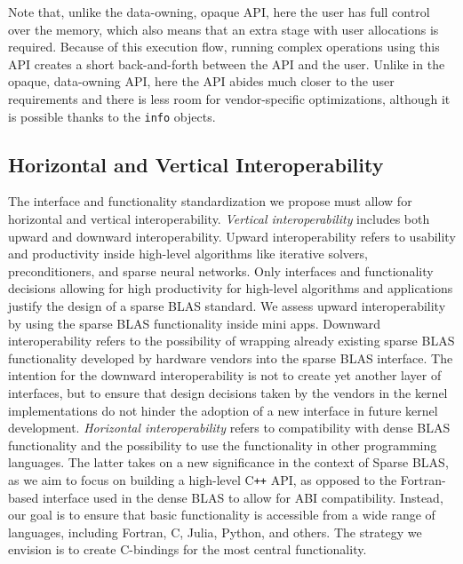 \documentclass{article}
\newcommand{\cplusplus}{C\texttt{++}\xspace}
\begin{document}
Note that, unlike the data-owning, opaque API, here the user has full control over the memory, which also means that an extra stage with user allocations is required. Because of this execution flow, running complex operations using this API creates a short back-and-forth between the API and the user. Unlike in the opaque, data-owning API, here the API abides much closer to the user requirements and there is less room for vendor-specific optimizations, although it is possible thanks to the \texttt{info} objects.

\noindent

\fi

\subsection{Horizontal and Vertical Interoperability}

The interface and functionality standardization we propose must allow for horizontal and vertical interoperability. 
\textit{Vertical interoperability} includes both upward and downward interoperability. Upward interoperability refers to usability and productivity inside high-level algorithms like iterative solvers, preconditioners, and sparse neural networks. Only interfaces and functionality decisions allowing for high productivity for high-level algorithms and applications justify the design of a sparse BLAS standard. We assess upward interoperability by using the sparse BLAS functionality inside mini apps. 
Downward interoperability refers to the possibility of wrapping already existing sparse BLAS functionality developed by hardware vendors into the sparse BLAS interface. The intention for the downward interoperability is not to create yet another layer of interfaces, but to ensure that design decisions taken by the vendors in the kernel implementations do not hinder the adoption of a new interface in future kernel 
development.
\textit{Horizontal interoperability} refers to compatibility with dense
BLAS functionality and the possibility to use the functionality in other
programming languages. The latter takes on a new significance in the
context of Sparse BLAS, as we aim to focus on building a high-level
\cplusplus API, as opposed to the Fortran-based interface used in the
dense BLAS to allow for ABI compatibility. Instead, our goal is to ensure that basic functionality is accessible from a wide range of languages, including Fortran, C, Julia, Python, and others. The strategy we envision is to create C-bindings for the most central functionality.
\end{document}

